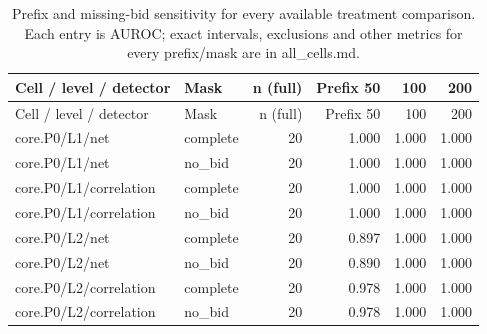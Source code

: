 \begingroup\footnotesize\setlength{\tabcolsep}{3pt}
\begin{longtable}{@{}p{2.2in}lrrrr@{}}
\caption{Prefix and missing-bid sensitivity for every available treatment comparison. Each entry is AUROC; exact intervals, exclusions and other metrics for every prefix/mask are in all\_cells.md.}\\
\toprule Cell / level / detector & Mask & n (full) & Prefix 50 & 100 & 200\\\midrule\endfirsthead
\toprule Cell / level / detector & Mask & n (full) & Prefix 50 & 100 & 200\\\midrule\endhead
\bottomrule\endfoot
core.\allowbreak P0/\allowbreak L1/\allowbreak net & complete & 20 & 1.000 & 1.000 & 1.000\\
core.\allowbreak P0/\allowbreak L1/\allowbreak net & no\_\allowbreak bid & 20 & 1.000 & 1.000 & 1.000\\
core.\allowbreak P0/\allowbreak L1/\allowbreak correlation & complete & 20 & 1.000 & 1.000 & 1.000\\
core.\allowbreak P0/\allowbreak L1/\allowbreak correlation & no\_\allowbreak bid & 20 & 1.000 & 1.000 & 1.000\\
core.\allowbreak P0/\allowbreak L2/\allowbreak net & complete & 20 & 0.897 & 1.000 & 1.000\\
core.\allowbreak P0/\allowbreak L2/\allowbreak net & no\_\allowbreak bid & 20 & 0.890 & 1.000 & 1.000\\
core.\allowbreak P0/\allowbreak L2/\allowbreak correlation & complete & 20 & 0.978 & 1.000 & 1.000\\
core.\allowbreak P0/\allowbreak L2/\allowbreak correlation & no\_\allowbreak bid & 20 & 0.978 & 1.000 & 1.000\\

\end{longtable}
